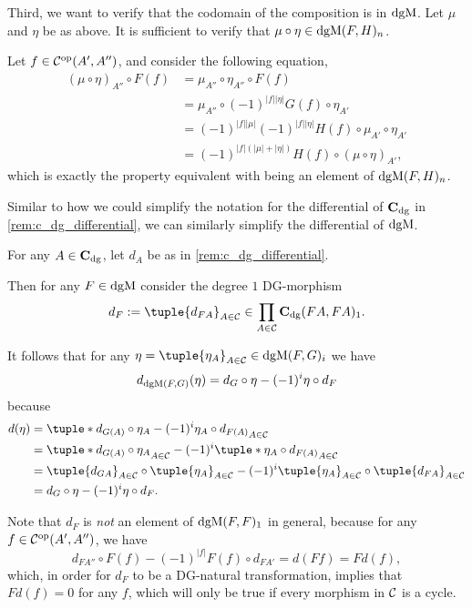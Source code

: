 \begin{remark}
    Third, we want to verify that the codomain of the composition is in \( \operatorname{dgM} \). Let \( \mu \) and \( \eta \) be as above. It is sufficient to verify that \( \mu \circ \eta \in \operatorname{dgM}(F, H)_n \).

    Let \( f \in {\mathcal{C}}^{\operatorname{op}}(A', A'') \), and consider the following equation,
    \begin{align*}
        (\mu \circ \eta)_{A''} \circ F(f) &= \mu_{A''} \circ \eta_{A''} \circ F(f) \\
        &= \mu_{A''} \circ (-1)^{|f||\eta|} G(f) \circ \eta_{A'} \\
        &= (-1)^{|f||\mu|}(-1)^{|f||\eta|} H(f) \circ \mu_{A'} \circ \eta_{A'} \\
        &= (-1)^{|f|(|\mu| + |\eta|)} H(f) \circ (\mu \circ \eta)_{A'},
    \end{align*}
    which is exactly the property equivalent with being an element of \( \operatorname{dgM}(F, H)_n \).
\end{remark}

Similar to how we could simplify the notation for the differential of \( \operatorname{\mathbf{C}}_{\operatorname{dg}} \) in \autoref{rem:c_dg_differential}, we can similarly simplify the differential of \( \operatorname{dgM} \).

\begin{remark}
    For any \( A \in \operatorname{\mathbf{C}}_{\operatorname{dg}} \), let \( d_A \) be as in \autoref{rem:c_dg_differential}.

    Then for any \( F \in \operatorname{dgM} \) consider the degree \( 1 \) DG-morphism
    \[
        d_F := \tuple{d_{FA}}_{A \in \Cc} \in \prod_{A \in \Cc} \C_{\dg}(FA, FA)_1.
    \]

    It follows that for any \( \eta = \tuple{\eta_A}_{A \in \Cc} \in \dgM(F, G)_i \) we have
    \[
        d_{\operatorname{dgM}(F, G)}(\eta) = d_G \circ \eta - (-1)^i \eta \circ d_F
    \]
    because
    \begin{align*}
        d(\eta) &= \tuple*{ d_{G(A)} \circ \eta_A - (-1)^i \eta_A \circ d_{F(A)} }_{A \in \Cc} \\
        &= \tuple*{ d_{G(A)} \circ \eta_A }_{A \in \Cc} - (-1)^i \tuple*{ \eta_A \circ d_{F(A)} }_{A \in \Cc} \\
        &= \tuple{d_{G A}}_{A \in \Cc} \circ \tuple{\eta_A}_{A \in \Cc} - (-1)^i \tuple{\eta_A}_{A \in \Cc} \circ \tuple{d_{F A}}_{A \in \Cc} \\
        &= d_G \circ \eta - (-1)^i \eta \circ d_F.
    \end{align*}
\end{remark}

Note that \( d_F \) is \emph{not} an element of \( \operatorname{dgM}(F, F)_1 \) in general, because for any \( f \in {\mathcal{C}}^{\operatorname{op}}(A', A'') \), we have
\[
    d_{F A''} \circ F(f) - (-1)^{|f|} F(f) \circ d_{F A'} = d(F f) = F d(f),
\]
which, in order for \( d_F \) to be a DG-natural transformation, implies that \( F d(f) = 0 \) for any \( f \), which will only be true if every morphism in \( {\mathcal{C}} \) is a cycle.
